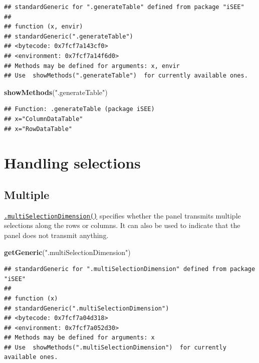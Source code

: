 \documentclass[
]{book}
\newenvironment{Shaded}{\begin{snugshade}}{\end{snugshade}}
\newcommand{\KeywordTok}[1]{\textcolor[rgb]{0.13,0.29,0.53}{\textbf{#1}}}
\newcommand{\NormalTok}[1]{#1}
\newcommand{\StringTok}[1]{\textcolor[rgb]{0.31,0.60,0.02}{#1}}
\begin{document}
\begin{verbatim}
## standardGeneric for ".generateTable" defined from package "iSEE"
## 
## function (x, envir) 
## standardGeneric(".generateTable")
## <bytecode: 0x7fcf7a143cf0>
## <environment: 0x7fcf7a14f6d0>
## Methods may be defined for arguments: x, envir
## Use  showMethods(".generateTable")  for currently available ones.
\end{verbatim}

\begin{Shaded}
\begin{Highlighting}[]
\KeywordTok{showMethods}\NormalTok{(}\StringTok{".generateTable"}\NormalTok{)}
\end{Highlighting}
\end{Shaded}

\begin{verbatim}
## Function: .generateTable (package iSEE)
## x="ColumnDataTable"
## x="RowDataTable"
\end{verbatim}

\hypertarget{handling-selections}{%
\section{Handling selections}\label{handling-selections}}

\hypertarget{multiple}{%
\subsection{Multiple}\label{multiple}}

\href{https://isee.github.io/iSEE/reference/multi-select-generics.html}{\texttt{.multiSelectionDimension()}} specifies whether the panel transmits multiple selections along the rows or columns.
It can also be used to indicate that the panel does not transmit anything.

\begin{Shaded}
\begin{Highlighting}[]
\KeywordTok{getGeneric}\NormalTok{(}\StringTok{".multiSelectionDimension"}\NormalTok{)}
\end{Highlighting}
\end{Shaded}

\begin{verbatim}
## standardGeneric for ".multiSelectionDimension" defined from package "iSEE"
## 
## function (x) 
## standardGeneric(".multiSelectionDimension")
## <bytecode: 0x7fcf7a04d318>
## <environment: 0x7fcf7a052d30>
## Methods may be defined for arguments: x
## Use  showMethods(".multiSelectionDimension")  for currently available ones.
\end{verbatim}
\end{document}
